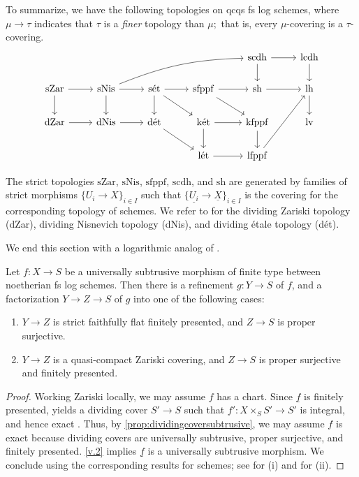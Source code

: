 \documentclass[10pt]{amsart}
\newcommand{\ul}{\underline}
\newcommand{\ket}{\mathrm{k\acute{e}t}}
\newcommand{\set}{\mathrm{s\acute{e}t}}
\newcommand{\letale}{\mathrm{l\acute{e}t}}
\begin{document}
To summarize, we have the following topologies on qcqs fs log schemes, 
where $\mu \to \tau$ indicates that $\tau$ is a \emph{finer} topology than $\mu;$ 
that is, every $\mu$-covering is a $\tau$-covering. 
\[
\begin{tikzcd}
&
&
&
&
\mathrm{scdh}\ar[d]\ar[r]&
\mathrm{lcdh}\ar[d]
\\
\mathrm{sZar}\ar[r]\ar[d]&
\mathrm{sNis}\ar[r]\ar[d]\ar[rrru,bend left=1em]&
\set\ar[d]\ar[rd]\ar[r]&
\mathrm{sfppf}\ar[rd]\ar[r]&
\mathrm{sh}\ar[r]&
\mathrm{lh}\ar[d]
\\
\mathrm{dZar}\ar[r]&
\mathrm{dNis}\ar[r]&
\mathrm{d\acute{e}t}\ar[rd]&
\ket\ar[d]\ar[r]&
\mathrm{kfppf}\ar[d]&
\mathrm{lv}
\\
&
&
&
\letale\ar[r]&
\mathrm{lfppf}\ar[ruu]
\end{tikzcd}
\]
\vspace{0.1in}

The strict topologies 
$\mathrm{sZar}$, $\mathrm{sNis}$, $\mathrm{sfppf}$, $\mathrm{scdh}$, and $\mathrm{sh}$ are generated by families of strict morphisms $\{U_i\to X\}_{i\in I}$ such that $\{\ul{U_i}\to \ul{X}\}_{i\in I}$ is the covering for the corresponding topology of schemes.
We refer to \cite[Definition 3.1.4]{logDM} for the dividing Zariski topology (dZar), dividing Nisnevich topology (dNis), and dividing \'etale topology (d\'et).
\vspace{0.1in}

We end this section with a logarithmic analog of \cite[Theorems 3.10, 3.12]{Rydh}.

\begin{theorem}
\label{thm:structuretheorem}
Let $f \colon X \to S$ be a universally subtrusive morphism of finite type between noetherian fs log schemes.
Then there is a refinement $g \colon Y \to S$ of $f$, and a factorization $Y\to Z \to S$ of $g$
into one of the following cases:
\begin{enumerate}
 \item[(i)] $Y\to Z$ is strict faithfully flat finitely presented, and $Z\to S$ is proper surjective.
 \item[(ii)] $Y\to Z$ is a quasi-compact Zariski covering, and $Z\to S$ is proper surjective and 
 finitely presented. 
\end{enumerate}
\end{theorem}
\begin{proof}
Working Zariski locally, we may assume $f$ has a chart. 
Since $\ul{f}$ is finitely presented, 
\cite[Theorem 1.1]{integrallogblowup} yields a dividing cover $S' \to S$ such that 
$f' \colon X\times_S S' \to S'$ is integral, 
and hence exact \cite[Theorem III.2.2.7]{Ogu}. 
Thus, by \cref{prop:dividingcoversubtrusive}, 
we may assume $f$ is exact because dividing covers are universally subtrusive, 
proper surjective, and finitely presented.
\cref{v.2} implies $\ul{f}$ is a universally subtrusive morphism.
We conclude using the corresponding results for schemes; 
see \cite[Theorem 3.10]{Rydh} for (i) and \cite[Theorem 3.12]{Rydh} for (ii).
\end{proof}
\end{document}
